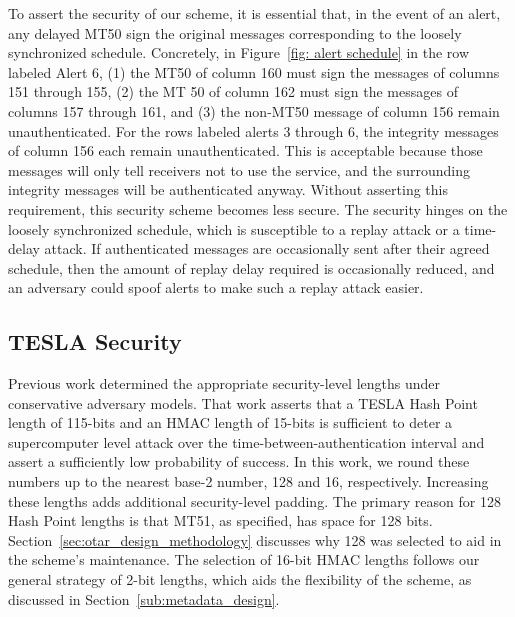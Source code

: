 \documentclass[letterpaper,times]{IONconf/IONconf}
\begin{document}
			To assert the security of our scheme, it is essential that, in the event of an alert, any delayed MT50 sign the original messages corresponding to the loosely synchronized schedule.
			Concretely, in Figure~\ref{fig: alert schedule} in the row labeled Alert 6, (1) the MT50 of column 160 must sign the messages of columns 151 through 155, (2) the MT 50 of column 162 must sign the messages of columns 157 through 161, and (3) the non-MT50 message of column 156 remain unauthenticated.
			For the rows labeled alerts 3 through 6, the integrity messages of column 156 each remain unauthenticated.
			This is acceptable because those messages will only tell receivers not to use the service, and the surrounding integrity messages will be authenticated anyway.
			Without asserting this requirement, this security scheme becomes less secure.
			The security hinges on the loosely synchronized schedule, which is susceptible to a replay attack or a time-delay attack.
			If authenticated messages are occasionally sent after their agreed schedule, then the amount of replay delay required is occasionally reduced, and an adversary could spoof alerts to make such a replay attack easier.

	\subsection{TESLA Security} \label{sub:tesla_security}

		Previous work determined the appropriate security-level lengths under conservative adversary models\cite{Neish_Dissertation}.
		That work asserts that a TESLA Hash Point length of 115-bits and an HMAC length of 15-bits is sufficient to deter a supercomputer level attack over the time-between-authentication interval and assert a sufficiently low probability of success.
		In this work, we round these numbers up to the nearest base-2 number, 128 and 16, respectively.
		Increasing these lengths adds additional security-level padding.
		The primary reason for 128 Hash Point lengths is that MT51, as specified, has space for 128 bits.
		Section~\ref{sec:otar_design_methodology} discusses why 128 was selected to aid in the scheme's maintenance.
		The selection of 16-bit HMAC lengths follows our general strategy of 2-bit lengths, which aids the flexibility of the scheme, as discussed in Section~\ref{sub:metadata_design}.
\end{document}
